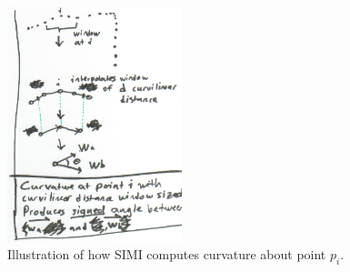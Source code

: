 \begin{figure}
  \centering
  \includegraphics[width=2in]{img/curve-diagram.png}
  \caption[Curvature]{Illustration of how SIMI computes curvature about point $p_i$.}
  \label{fig:curvature-diagram}
\end{figure}
